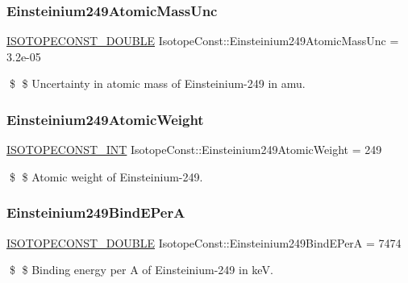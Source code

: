 \subsubsection{\texorpdfstring{Einsteinium249\+Atomic\+Mass\+Unc}{Einsteinium249AtomicMassUnc}}
{\footnotesize\ttfamily \mbox{\hyperlink{group___isotope_const-_macros_ga8f45a7272ce02c0b4c65c44636ed719a}{I\+S\+O\+T\+O\+P\+E\+C\+O\+N\+S\+T\+\_\+\+D\+O\+U\+B\+LE}} Isotope\+Const\+::\+Einsteinium249\+Atomic\+Mass\+Unc = 3.\+2e-\/05}

\$ \$ Uncertainty in atomic mass of Einsteinium-\/249 in amu. \mbox{\label{group___isotope_const-_einsteinium-_es249_ga9bdca0ad09f7857e34676f27e345884b}} 
\subsubsection{\texorpdfstring{Einsteinium249\+Atomic\+Weight}{Einsteinium249AtomicWeight}}
{\footnotesize\ttfamily \mbox{\hyperlink{group___isotope_const-_macros_ga5f18360b3e99483a35c32d789e62621c}{I\+S\+O\+T\+O\+P\+E\+C\+O\+N\+S\+T\+\_\+\+I\+NT}} Isotope\+Const\+::\+Einsteinium249\+Atomic\+Weight = 249}

\$ \$ Atomic weight of Einsteinium-\/249. \mbox{\label{group___isotope_const-_einsteinium-_es249_gaea89c8f2cff600c454d901bbecb1e4e1}} 
\subsubsection{\texorpdfstring{Einsteinium249\+Bind\+E\+PerA}{Einsteinium249BindEPerA}}
{\footnotesize\ttfamily \mbox{\hyperlink{group___isotope_const-_macros_ga8f45a7272ce02c0b4c65c44636ed719a}{I\+S\+O\+T\+O\+P\+E\+C\+O\+N\+S\+T\+\_\+\+D\+O\+U\+B\+LE}} Isotope\+Const\+::\+Einsteinium249\+Bind\+E\+PerA = 7474}

\$ \$ Binding energy per A of Einsteinium-\/249 in keV. \mbox{\label{group___isotope_const-_einsteinium-_es249_ga534c8991092f38765b7c600d08056372}} 

